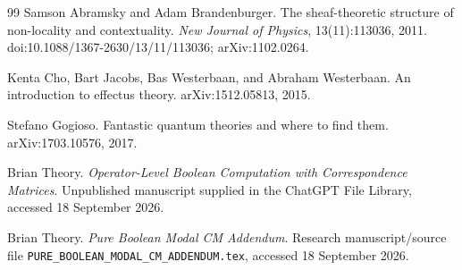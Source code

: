 \documentclass[11pt]{article}
\theoremstyle{definition}
\begin{document}
\begin{thebibliography}{99}
Samson Abramsky and Adam Brandenburger.
\newblock The sheaf-theoretic structure of non-locality and contextuality.
\newblock \emph{New Journal of Physics}, 13(11):113036, 2011.
\newblock doi:10.1088/1367-2630/13/11/113036; arXiv:1102.0264.

Kenta Cho, Bart Jacobs, Bas Westerbaan, and Abraham Westerbaan.
\newblock An introduction to effectus theory.
\newblock arXiv:1512.05813, 2015.

Stefano Gogioso.
\newblock Fantastic quantum theories and where to find them.
\newblock arXiv:1703.10576, 2017.

Brian Theory.
\newblock \emph{Operator-Level Boolean Computation with Correspondence Matrices}.
\newblock Unpublished manuscript supplied in the ChatGPT File Library, accessed 18 September 2026.

Brian Theory.
\newblock \emph{Pure Boolean Modal CM Addendum}.
\newblock Research manuscript/source file \texttt{PURE\_BOOLEAN\_MODAL\_CM\_ADDENDUM.tex}, accessed 18 September 2026.

\end{thebibliography}
\end{document}

